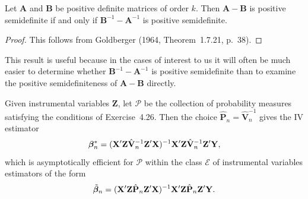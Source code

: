 \begin{proposition}\label{prop:4.44}
Let $\mathbf{A}$ and $\mathbf{B}$ be positive definite matrices of order $k$. Then $\mathbf{A} - \mathbf{B}$ is positive semidefinite if and only if $\mathbf{B}^{-1} - \mathbf{A}^{-1}$ is positive semidefinite.
\end{proposition}

\begin{proof}
This follows from Goldberger (1964, Theorem~1.7.21, p.~38).
\end{proof}

This result is useful because in the cases of interest to us it will often be
much easier to determine whether $\mathbf{B}^{-1} - \mathbf{A}^{-1}$ is positive semidefinite than
to examine the positive semidefiniteness of $\mathbf{A} - \mathbf{B}$ directly.

\begin{proposition}\label{prop:4.45}
Given instrumental variables $\mathbf{Z}$, let $\mathcal{P}$ be the collection of probability measures satisfying the conditions of Exercise~4.26. Then the choice $\hat{\mathbf{P}}_n = \hat{\mathbf{V}}_n^{-1}$ gives the IV estimator
\[
\boldsymbol{\beta}_n^* = (\mathbf{X}'\mathbf{Z}\hat{\mathbf{V}}_n^{-1}\mathbf{Z}'\mathbf{X})^{-1}\mathbf{X}'\mathbf{Z}\hat{\mathbf{V}}_n^{-1}\mathbf{Z}'\mathbf{Y},
\]
which is asymptotically efficient for $\mathcal{P}$ within the class $\mathcal{E}$ of instrumental variables estimators of the form
\[
\tilde{\boldsymbol{\beta}}_n = (\mathbf{X}'\mathbf{Z}\hat{\mathbf{P}}_n\mathbf{Z}'\mathbf{X})^{-1}\mathbf{X}'\mathbf{Z}\hat{\mathbf{P}}_n\mathbf{Z}'\mathbf{Y}.
\]
\end{proposition}

